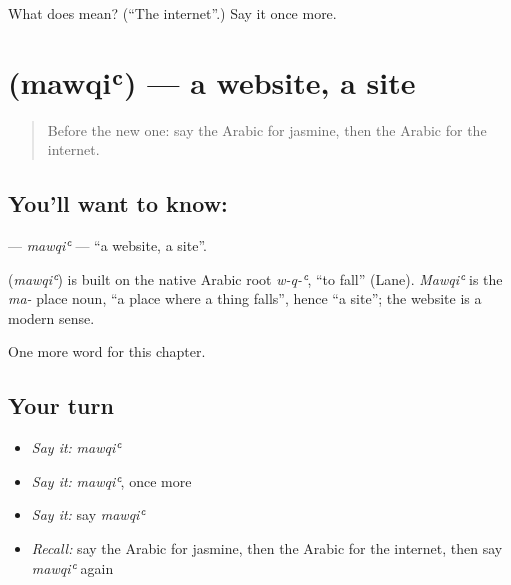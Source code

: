 \begin{tcolorbox}[breakable,colback=teal!4,colframe=teal!35!black,title={Before you move on}]
What does  mean? (\textquotedblleft{}The internet\textquotedblright{}.) Say it once more.
\end{tcolorbox}
\section[\texorpdfstring{\ar{موقع} (mawqiʿ)}{موقع (mawqiʿ)}]{ (mawqiʿ) — a website, a site}

\label{lesson:AR-C248-mawqi}



\begin{quote}
Before the new one: say the Arabic for jasmine, then the Arabic for the internet.
\end{quote}

\subsection*{You'll want to know: }
\textbf{} — \emph{mawqiʿ} — \textquotedblleft{}a website, a site\textquotedblright{}.

\begin{cousinweb}
\textbf{} (\emph{mawqiʿ}) is built on the native Arabic root \emph{w-q-ʿ}, \textquotedblleft{}to fall\textquotedblright{} (Lane). \emph{Mawqiʿ} is the \emph{ma-} place noun, \textquotedblleft{}a place where a thing falls\textquotedblright{}, hence \textquotedblleft{}a site\textquotedblright{}; the website is a modern sense.
\end{cousinweb}

\begin{grammarlens}[title={What you've built}]
One more word for this chapter.
\end{grammarlens}

\subsection*{Your turn}
\begin{itemize}
\raggedright
  \item \emph{Say it:} \emph{mawqiʿ}
  \item \emph{Say it:} \emph{mawqiʿ}, once more
  \item \emph{Say it:} say \emph{mawqiʿ}
  \item \emph{Recall:} say the Arabic for jasmine, then the Arabic for the internet, then say \emph{mawqiʿ} again
\end{itemize}

